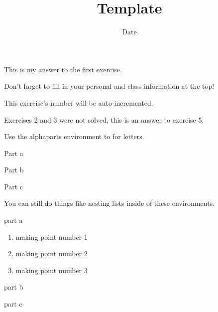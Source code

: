 \documentclass[220a]{homework}
\title{Template}
\date{Date}
\begin{document}
\maketitle

\begin{numedexercise}
  This is my answer to the first exercise.

  Don't forget to fill in your personal and class information at the top!
\end{numedexercise}

\begin{numedexercise}
  This exercise's number will be auto-incremented.
\end{numedexercise}


\setcounter{exerciseCounter}{4}
\begin{numedexercise}
  Exercises 2 and 3 were not solved, this is an answer to exercise 5.
\end{numedexercise}


\begin{numedexercise}
  Use the alphaparts environment to for letters.
  \begin{alphaparts}
    \item Part a
    \item Part b
    \item Part c
  \end{alphaparts}
\end{numedexercise}

\begin{numedexercise}
  You can still do things like nesting lists inside of these environments.
  \begin{alphaparts}
    \item part a
      \begin{enumerate}[label=(\roman*)]
        \item making point number 1
        \item making point number 2
        \item making point number 3
      \end{enumerate}
    \item part b
    \item part c
  \end{alphaparts}
\end{numedexercise}

\renewcommand{\writtensection}{2}
\end{document}
